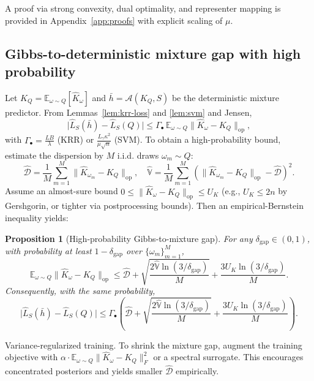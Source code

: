 \documentclass{article}
\newtheorem{proposition}{Proposition}
\begin{document}
A proof via strong convexity, dual optimality, and representer mapping is provided in Appendix~\ref{app:proofs} with explicit scaling of $\mu$.

\subsection{Gibbs-to-deterministic mixture gap with high probability}\label{subsec:gibbs-mixture}
Let $K_Q=\mathbb{E}_{\omega\sim Q}[\widehat{K}_\omega]$ and $\bar{h}=\mathcal{A}(K_Q,S)$ be the deterministic mixture predictor. From Lemmas~\ref{lem:krr-loss} and \ref{lem:svm} and Jensen,
\[
\big|\hat{L}_S(\bar{h})-\hat{L}_S(Q)\big| \le \Gamma_{\bullet}\, \mathbb{E}_{\omega\sim Q}\|\widehat{K}_\omega-K_Q\|_{\mathrm{op}},
\]
with $\Gamma_{\bullet}=\frac{LB}{\lambda}$ (KRR) or $\frac{L_\gamma \kappa^2}{\mu \sqrt{n}}$ (SVM). To obtain a high-probability bound, estimate the dispersion by $M$ i.i.d. draws $\omega_m\sim Q$:
\[
\widehat{\mathcal{D}}=\frac{1}{M}\sum_{m=1}^M \|\widehat{K}_{\omega_m}-K_Q\|_{\mathrm{op}},\quad
\widehat{\mathbb{V}}=\frac{1}{M}\sum_{m=1}^M \left(\|\widehat{K}_{\omega_m}-K_Q\|_{\mathrm{op}}-\widehat{\mathcal{D}}\right)^2.
\]
Assume an almost-sure bound $0\le \|\widehat{K}_{\omega}-K_Q\|_{\mathrm{op}}\le U_K$ (e.g., $U_K\le 2n$ by Gershgorin, or tighter via postprocessing bounds). Then an empirical-Bernstein inequality yields:

\begin{proposition}[High-probability Gibbs-to-mixture gap]\label{prop:gibbs-mixture-hp}
For any $\delta_{\mathrm{gap}}\in(0,1)$, with probability at least $1-\delta_{\mathrm{gap}}$ over $\{\omega_m\}_{m=1}^M$,
\[
\mathbb{E}_{\omega\sim Q}\|\widehat{K}_\omega-K_Q\|_{\mathrm{op}} \le \widehat{\mathcal{D}} + \sqrt{\frac{2\widehat{\mathbb{V}}\ln(3/\delta_{\mathrm{gap}})}{M}} + \frac{3U_K\ln(3/\delta_{\mathrm{gap}})}{M}.
\]
Consequently, with the same probability,
\[
\big|\hat{L}_S(\bar{h})-\hat{L}_S(Q)\big| \le \Gamma_{\bullet}\left(\widehat{\mathcal{D}} + \sqrt{\frac{2\widehat{\mathbb{V}}\ln(3/\delta_{\mathrm{gap}})}{M}} + \frac{3U_K\ln(3/\delta_{\mathrm{gap}})}{M}\right).
\]
\end{proposition}

Variance-regularized training. To shrink the mixture gap, augment the training objective with $\alpha\cdot \mathbb{E}_{\omega\sim Q}\|\widehat{K}_\omega-K_Q\|_{F}^2$ or a spectral surrogate. This encourages concentrated posteriors and yields smaller $\widehat{\mathcal{D}}$ empirically.
\end{document}
